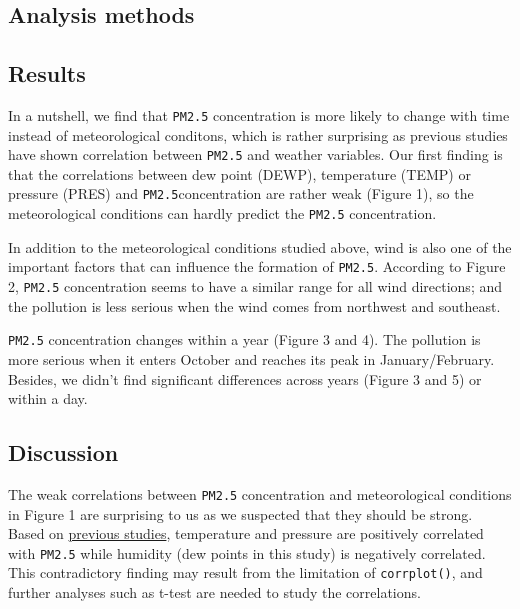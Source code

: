 \documentclass[]{article}
\begin{document}
\hypertarget{analysis-methods}{%
\subsection{Analysis methods}\label{analysis-methods}}

\hypertarget{results}{%
\subsection{Results}\label{results}}

In a nutshell, we find that \texttt{PM2.5} concentration is more likely
to change with time instead of meteorological conditons, which is rather
surprising as previous studies have shown correlation between
\texttt{PM2.5} and weather variables. Our first finding is that the
correlations between dew point (DEWP), temperature (TEMP) or pressure
(PRES) and \texttt{PM2.5}concentration are rather weak (Figure 1), so
the meteorological conditions can hardly predict the \texttt{PM2.5}
concentration.

In addition to the meteorological conditions studied above, wind is also
one of the important factors that can influence the formation of
\texttt{PM2.5}. According to Figure 2, \texttt{PM2.5} concentration
seems to have a similar range for all wind directions; and the pollution
is less serious when the wind comes from northwest and southeast.

\texttt{PM2.5} concentration changes within a year (Figure 3 and 4). The
pollution is more serious when it enters October and reaches its peak in
January/February. Besides, we didn't find significant differences across
years (Figure 3 and 5) or within a day.

\hypertarget{discussion}{%
\subsection{Discussion}\label{discussion}}

The weak correlations between \texttt{PM2.5} concentration and
meteorological conditions in Figure 1 are surprising to us as we
suspected that they should be strong. Based on
\href{https://www.atmos-chem-phys.net/18/5343/2018/acp-18-5343-2018.pdf}{previous
studies}, temperature and pressure are positively correlated with
\texttt{PM2.5} while humidity (dew points in this study) is negatively
correlated. This contradictory finding may result from the limitation of
\texttt{corrplot()}, and further analyses such as t-test are needed to
study the correlations.
\end{document}

